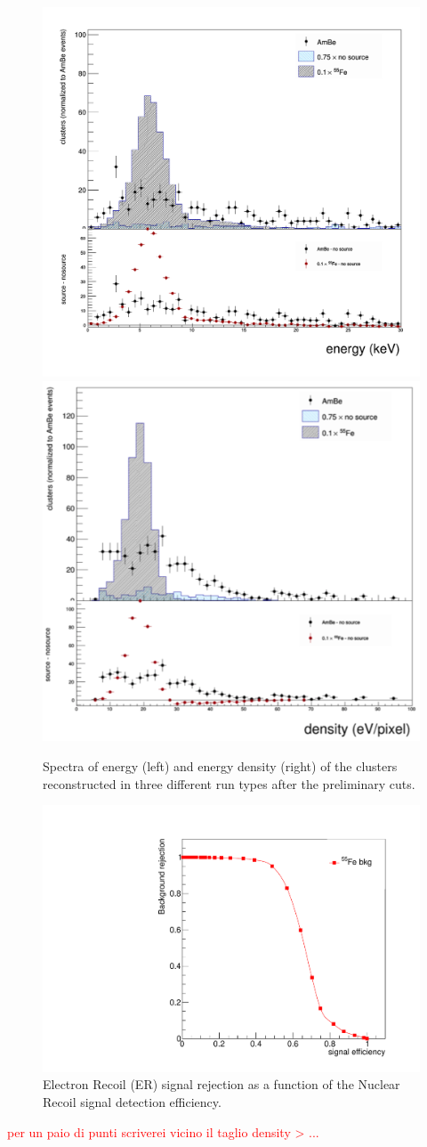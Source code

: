 \documentclass[12pt]{iopart}
\begin{document}
\begin{figure}[ht]
	\centering
	\includegraphics[width=0.45\linewidth]{energy_spectrum.png}
	\includegraphics[width=0.45\linewidth]{density_spectrum.png}
  	\caption{Spectra of energy (left) and energy density (right) of the clusters reconstructed in three different run types after the preliminary cuts.}
  	\label{fig:ene&dens}
\end{figure}

\begin{figure}[ht]
	\centering
	\includegraphics[width=0.50\linewidth]{density_roc.pdf}
  	\caption{Electron Recoil (ER) signal rejection as a function of the Nuclear Recoil signal detection efficiency.}
  	\label{fig:roc}
\end{figure}
\textcolor{red}{per un paio di punti scriverei vicino il taglio density > ...}
\end{document}
